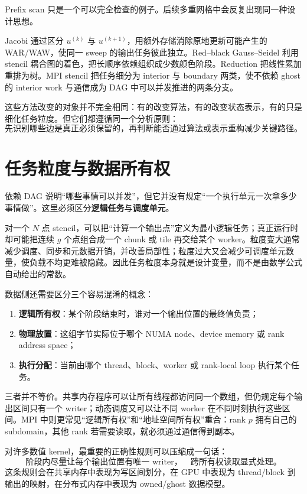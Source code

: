 Prefix scan 只是一个可以完全检查的例子。后续多重网格中会反复出现同一种设计思想。

Jacobi 通过区分 $u^{(k)}$ 与 $u^{(k+1)}$，用额外存储消除原地更新可能产生的 WAR/WAW，使同一 sweep 的输出任务彼此独立。Red--black Gauss--Seidel 利用 stencil 耦合图的着色，把长顺序依赖组织成少数颜色阶段。Reduction 把线性累加重排为树。MPI stencil 把任务细分为 interior 与 boundary 两类，使不依赖 ghost 的 interior work 与通信成为 DAG 中可以并发推进的两条分支。

这些方法改变的对象并不完全相同：有的改变算法，有的改变状态表示，有的只是细化任务粒度。但它们都遵循同一个分析原则：
\begin{equation}
\boxed{
\text{先识别哪些边是真正必须保留的，再判断能否通过算法或表示重构减少关键路径。}
}
\label{eq:parallel-dag-design-principle}
\end{equation}

\section{任务粒度与数据所有权}

依赖 DAG 说明“哪些事情可以并发”，但它并没有规定“一个执行单元一次拿多少事情做”。这里必须区分\textbf{逻辑任务}与\textbf{调度单元}。

对一个 $N$ 点 stencil，可以把“计算一个输出点”定义为最小逻辑任务；真正运行时却可能把连续 $g$ 个点组合成一个 chunk 或 tile 再交给某个 worker。粒度变大通常减少调度、同步和元数据开销，并改善局部性；粒度过大又会减少可调度单元数量，使负载不均更难被隐藏。因此任务粒度本身就是设计变量，而不是由数学公式自动给出的常数。

数据侧还需要区分三个容易混淆的概念：
\begin{enumerate}
\item \textbf{逻辑所有权}：某个阶段结束时，谁对一个输出位置的最终值负责；
\item \textbf{物理放置}：这组字节实际位于哪个 NUMA node、device memory 或 rank address space；
\item \textbf{执行分配}：当前由哪个 thread、block、worker 或 rank-local loop 执行某个任务。
\end{enumerate}

三者并不等价。共享内存程序可以让所有线程都访问同一个数组，但仍规定每个输出区间只有一个 writer；动态调度又可以让不同 worker 在不同时刻执行这些区间。MPI 中则更常见“逻辑所有权”和“地址空间所有权”重合：rank $p$ 拥有自己的 subdomain，其他 rank 若需要读取，就必须通过通信得到副本。

对许多数值 kernel，最重要的正确性规则可以压缩成一句话：
\begin{equation}
\boxed{
\text{阶段内尽量让每个输出位置有唯一 writer，}
\quad
\text{跨所有权读取显式处理。}
}
\end{equation}
这条规则会在共享内存中表现为写区间划分，在 GPU 中表现为 thread/block 到输出的映射，在分布式内存中表现为 owned/ghost 数据模型。

